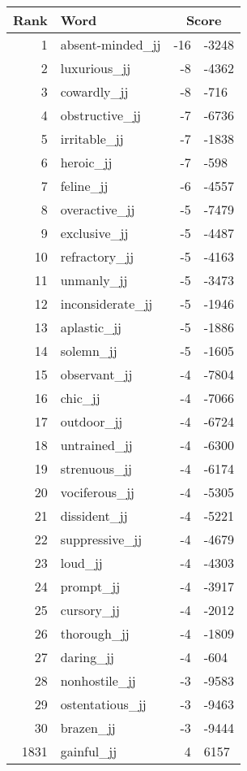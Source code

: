 \begin{longtable}[!htbp]{| rlr@{.}l |}
    \hline
    \textbf{Rank} & \textbf{Word} & \multicolumn{2}{c|}{\textbf{Score}} \\
    \hline
    \endhead
    1 & absent-minded\_jj & -16 & -3248 \\
    2 & luxurious\_jj & -8 & -4362 \\
    3 & cowardly\_jj & -8 & -716 \\
    4 & obstructive\_jj & -7 & -6736 \\
    5 & irritable\_jj & -7 & -1838 \\
    6 & heroic\_jj & -7 & -598 \\
    7 & feline\_jj & -6 & -4557 \\
    8 & overactive\_jj & -5 & -7479 \\
    9 & exclusive\_jj & -5 & -4487 \\
    10 & refractory\_jj & -5 & -4163 \\
    11 & unmanly\_jj & -5 & -3473 \\
    12 & inconsiderate\_jj & -5 & -1946 \\
    13 & aplastic\_jj & -5 & -1886 \\
    14 & solemn\_jj & -5 & -1605 \\
    15 & observant\_jj & -4 & -7804 \\
    16 & chic\_jj & -4 & -7066 \\
    17 & outdoor\_jj & -4 & -6724 \\
    18 & untrained\_jj & -4 & -6300 \\
    19 & strenuous\_jj & -4 & -6174 \\
    20 & vociferous\_jj & -4 & -5305 \\
    21 & dissident\_jj & -4 & -5221 \\
    22 & suppressive\_jj & -4 & -4679 \\
    23 & loud\_jj & -4 & -4303 \\
    24 & prompt\_jj & -4 & -3917 \\
    25 & cursory\_jj & -4 & -2012 \\
    26 & thorough\_jj & -4 & -1809 \\
    27 & daring\_jj & -4 & -604 \\
    28 & nonhostile\_jj & -3 & -9583 \\
    29 & ostentatious\_jj & -3 & -9463 \\
    30 & brazen\_jj & -3 & -9444 \\
    1831 & gainful\_jj & 4 & 6157 \\

\end{longtable}
